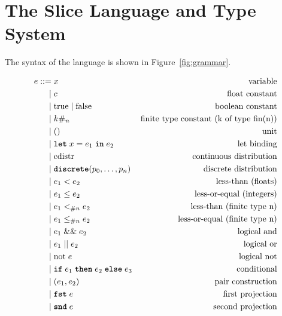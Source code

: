 \section{The Slice Language and Type System}\label{sec:language}

The syntax of the \Slice{} language is shown in Figure~\ref{fig:grammar}.

\begin{figure}[h]
\begin{align*}
e ::= &\; x                               & \text{variable} \\
    | &\; c                               & \text{float constant} \\
    | &\; \text{true} \mid \text{false}   & \text{boolean constant} \\
    | &\; \finconst{k}{n}                 & \text{finite type constant (k of type fin(n))} \\
    | &\; ()                              & \text{unit} \\
    | &\; \letkw \; x = e_1\; \inkw \; e_2  & \text{let binding} \\
    | &\; \text{cdistr}                   & \text{continuous distribution} \\
    | &\; \discrete(p_0, \ldots, p_{n})      & \text{discrete distribution} \\
    | &\; e_1 < e_2                       & \text{less-than (floats)} \\
    | &\; e_1 \leq e_2                    & \text{less-or-equal (integers)} \\
    | &\; e_1 \finlt{n} e_2              & \text{less-than (finite type n)} \\
    | &\; e_1 \finleq{n} e_2             & \text{less-or-equal (finite type n)} \\
    | &\; e_1 \logand e_2                 & \text{logical and} \\
    | &\; e_1 \logor e_2                  & \text{logical or} \\
    | &\; \text{not}\; e                  & \text{logical not} \\
    | &\; \ifkw \; e_1\; \thenkw \; e_2\; \elsekw \; e_3 & \text{conditional} \\
    | &\; (e_1, e_2)                      & \text{pair construction} \\
    | &\; \fstkw \; e                     & \text{first projection} \\
    | &\; \sndkw \; e                     & \text{second projection} \\

\end{align*}
\end{figure}
